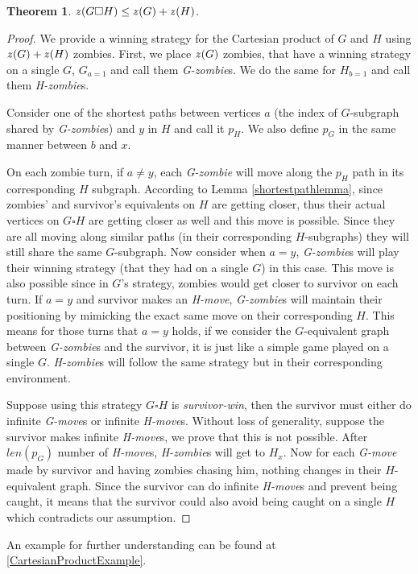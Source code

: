 \documentclass[1p]{elsarticle}
\newtheorem{theorem}{Theorem}
\newcommand{\zn}{\ooalign{$z$\cr\hfil\rule[.5ex]{.2em}{.08ex}\hfil\cr}}
\begin{document}
\begin{theorem}
	\label{T2}
	$\zn(G \square H) \leq \zn(G) + \zn(H)$.
\end{theorem}

\begin{proof}
	We provide a winning strategy for the Cartesian product of $G$ and $H$ using $\zn(G)+\zn(H)$ zombies. First, we place
	$\zn(G)$ zombies, that have a winning strategy on a single $G$, $G_{a = 1}$ and call them {\it G-zombie}s. We do the
	same for $H_{b = 1}$ and call them {\it H-zombie}s.


	Consider one of the shortest paths between vertices $a$ (the index of $G$-subgraph shared by {\it G-zombie}s) and
	$y$ in $H$ and call it $p_H$. We also define $p_G$ in the same manner between $b$ and $x$.


	On each zombie turn, if $a \neq y$, each {\it G-zombie} will move along the $p_H$ path in its corresponding $H$
	subgraph. According to Lemma \ref{shortestpathlemma}, since zombies' and survivor's equivalents on $H$ are getting
	closer, thus their actual vertices on $G \square H$ are getting closer as well and this move is possible. Since they
	are all moving along similar paths (in their corresponding $H$-subgraphs) they will still share the same
	$G$-subgraph. Now consider when $a = y$, {\it G-zombie}s will play their winning strategy (that they had on a single
	$G$) in this case. This move is also possible since in $G$'s strategy, zombies would get closer to survivor on each
	turn. If $a = y$ and survivor makes an {\it H-move}, {\it G-zombie}s will maintain their positioning by mimicking
	the exact same move on their corresponding $H$. This means for those turns that $a=y$ holds, if we consider the
	$G$-equivalent graph between {\it G-zombie}s and the survivor, it is just like a simple game played on a single $G$.
	{\it H-zombie}s will follow the same strategy but in their corresponding environment.
	
	
	Suppose using this strategy $G \square H$ is {\it survivor-win}, then the survivor must either do infinite {\it
	G-move}s or infinite {\it H-move}s. Without loss of generality, suppose the survivor makes infinite {\it H-move}s,
	we prove that this is not possible. After $len(p_G)$ number of {\it H-move}s, {\it H-zombie}s will get to $H_x$. Now
	for each {\it G-move} made by survivor and having zombies chasing him, nothing changes in their $H$-equivalent
	graph. Since the survivor can do infinite {\it H-move}s and prevent being caught, it means that the survivor could
	also avoid being caught on a single $H$ which contradicts our assumption.
	
\end{proof}
An example for further understanding can be found at \ref{CartesianProductExample}.
\end{document}
